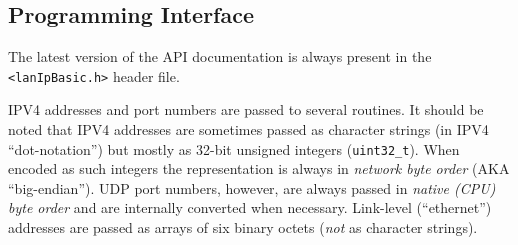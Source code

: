\documentclass{article}
\newcommand{\lipc}[1]{{\tt #1}}
\newcommand{\lipf}[1]{{\tt #1}}
\begin{document}
  \subsection{Programming Interface}
The latest version of the API documentation is always present in
the \lipf{<lanIpBasic.h>} header file.

IPV4 addresses and port numbers are passed to several routines.
It should be noted that IPV4 addresses
are sometimes passed as character strings (in IPV4 ``dot-notation'')
but mostly as 32-bit unsigned integers (\lipc{uint32\_t}). When encoded
as such integers the representation is always in {\em network byte order}
(AKA ``big-endian''). UDP port numbers, however, are always passed in
{\em native (CPU) byte order} and are internally converted when necessary.
Link-level (``ethernet'') addresses are passed as arrays of
six binary octets ({\em not} as character strings).
\end{document}
